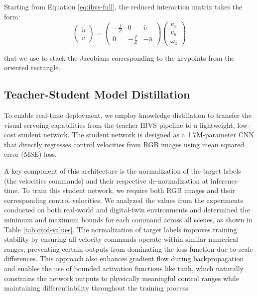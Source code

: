 \documentclass[10pt,twocolumn,letterpaper]{article}
\begin{document}
Starting from Equation \ref{eq:ibvs-full}, the reduced interaction matrix takes the form:
\begin{equation}
\label{eq:numerical-stable-efficient-reduced-ibvs}
\begin{pmatrix}
\dot{u} \\
\dot{v}
\end{pmatrix} = \begin{pmatrix}
-\frac{f}{Z} & 0 & \bar{v} \\
0 & -\frac{f}{Z} & -\bar{u}
\end{pmatrix} \begin{pmatrix}
v_x \\
v_y \\
\omega_z
\end{pmatrix}
\end{equation}

that we use to stack the Jacobians corresponding to the keypoints from the oriented rectangle.

\subsection{Teacher-Student Model Distillation}
\label{sec:know_dist}

To enable real-time deployment, we employ knowledge distillation \cite{hinton2015distillingknowledgeneuralnetwork} to transfer the visual servoing capabilities from the teacher IBVS pipeline to a lightweight, low-cost student network. The student network is designed as a 1.7M-parameter CNN that directly regresses control velocities from RGB images using mean squared error (MSE) loss.

A key component of this architecture is the normalization of the target labels (the velocities commands) and their respective de-normalization at inference time. To train this student network, we require both RGB images and their corresponding control velocities. We analyzed the values from the experiments conducted on both real-world and digital-twin environments and determined the minimum and maximum bounds for each command across all scenes, as shown in Table \ref{tab:cmd-values}. The normalization of target labels improves training stability by ensuring all velocity commands operate within similar numerical ranges, preventing certain outputs from dominating the loss function due to scale differences. This approach also enhances gradient flow during backpropagation and enables the use of bounded activation functions like tanh, which naturally constrains the network outputs to physically meaningful control ranges while maintaining differentiability throughout the training process.
\end{document}
